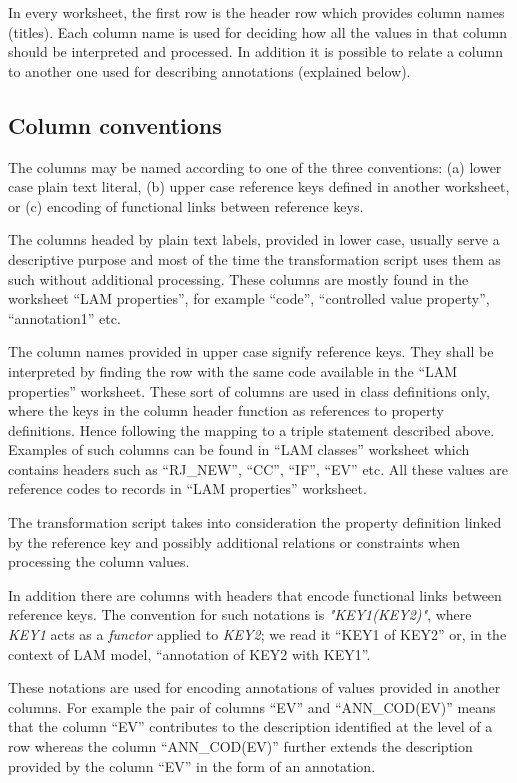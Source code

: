 In every worksheet, the first row is the header row which provides column names (titles). Each column name is used for deciding how all the values in that column should be interpreted and processed. In addition it is possible to relate a column to another one used for describing annotations (explained below).

\subsection{Column conventions}

The columns may be named according to one of the three conventions: (a) lower case plain text literal, (b) upper case reference keys defined in another worksheet, or (c) encoding of functional links between reference keys.

The columns headed by plain text labels, provided in lower case, usually serve a descriptive purpose and most of the time the transformation script uses them as such without additional processing. These columns are mostly found in the worksheet ``LAM properties'', for example ``code'',  ``controlled value property'',  ``annotation1'' etc.

The column names provided in upper case signify reference keys. They shall be interpreted by finding the row with the same code available in the ``LAM properties'' worksheet. These sort of columns are used in class definitions only, where the keys in the column header function as references to property definitions. Hence following the mapping to a triple statement described above. Examples of such columns can be found in  ``LAM classes'' worksheet which contains headers such as ``RJ\_NEW'', ``CC'',  ``IF'',  ``EV'' etc. All these values are reference codes to records in ``LAM properties'' worksheet.

The transformation script takes into consideration the property definition linked by the reference key and possibly additional relations or constraints when processing the column values.

In addition there are columns with headers that encode functional links between reference keys.  The convention for such notations is \textit{"KEY1(KEY2)"}, where \textit{KEY1} acts as a \textit{functor} applied to \textit{KEY2}; we read it ``KEY1 of KEY2'' or, in the context of LAM model, ``annotation of KEY2 with KEY1''.

These notations are used for encoding annotations of values provided in another columns. For example the pair of columns ``EV'' and ``ANN\_COD(EV)'' means that the column ``EV'' contributes to the description identified at the level of a row whereas the column  ``ANN\_COD(EV)'' further extends the description provided by the column ``EV'' in the form of an annotation.

